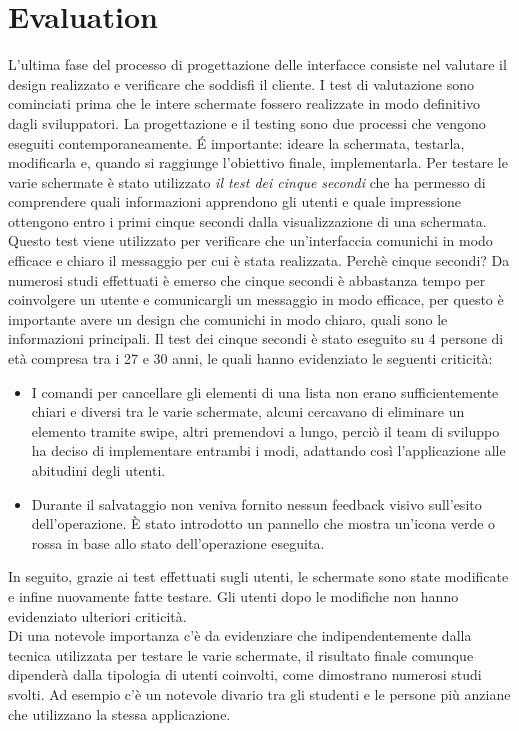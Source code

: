 \documentclass[12pt]{report}
\begin{document}
\section{Evaluation}
L'ultima fase del processo di progettazione delle interfacce consiste nel valutare il design realizzato e verificare che soddisfi il cliente. I test di valutazione sono cominciati prima che le intere schermate fossero realizzate in modo definitivo dagli sviluppatori. La progettazione e il testing sono due processi che vengono eseguiti contemporaneamente. É importante: ideare la schermata, testarla, modificarla e, quando si raggiunge l'obiettivo finale, implementarla. Per testare le varie schermate è stato utilizzato \textit{il test dei cinque secondi} che ha permesso di comprendere quali informazioni apprendono gli utenti e quale impressione ottengono entro i primi cinque secondi dalla visualizzazione di una schermata. Questo test viene utilizzato per verificare che un'interfaccia comunichi in modo efficace e chiaro il messaggio per cui è stata realizzata. Perchè cinque secondi? Da numerosi studi effettuati è emerso che cinque secondi è abbastanza tempo per coinvolgere un utente e comunicargli un messaggio in modo efficace, per questo è importante avere un design che comunichi in modo chiaro, quali sono le informazioni principali.
Il test dei cinque secondi è stato eseguito su 4 persone di età compresa tra i 27 e 30 anni, le quali hanno evidenziato le seguenti criticità:
\begin{itemize}
	\item I comandi per cancellare gli elementi di una lista non erano sufficientemente chiari e diversi tra le varie schermate, alcuni cercavano di eliminare un elemento tramite swipe, altri premendovi a lungo, perciò il team di sviluppo ha deciso di implementare
	entrambi i modi, adattando così l'applicazione alle abitudini degli utenti.
	\item Durante il salvataggio non veniva fornito nessun feedback visivo sull'esito dell'operazione. È stato introdotto un pannello che mostra un'icona verde o rossa in base allo stato dell'operazione eseguita.
\end{itemize}
In seguito, grazie ai test effettuati sugli utenti, le schermate sono state modificate e infine nuovamente fatte testare. Gli utenti dopo le modifiche non hanno evidenziato ulteriori criticità.\\
Di una notevole importanza c'è da evidenziare che indipendentemente dalla tecnica utilizzata per testare le varie schermate, il risultato finale comunque dipenderà dalla tipologia di utenti coinvolti, come dimostrano numerosi studi svolti. Ad esempio c'è un notevole divario tra gli studenti e le persone più anziane che utilizzano la stessa applicazione.\cite{Test}
\end{document}
